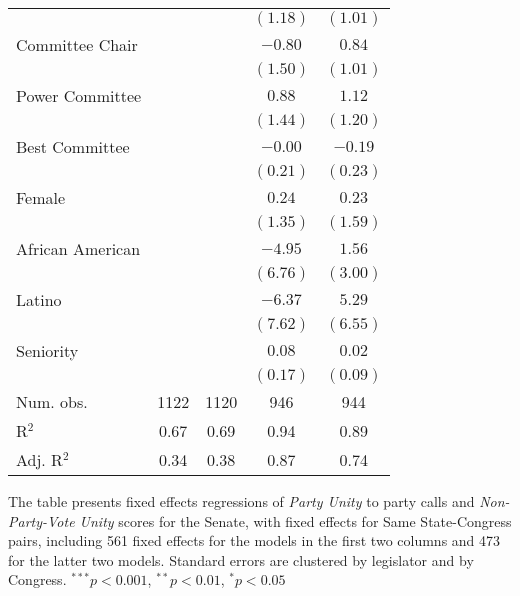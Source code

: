 \documentclass[12pt]{article}
\begin{document}
\begin{table}[!htbp]
{\begin{threeparttable}
\begin{tabular}{l c c c c }
                          &               &            & $(1.18)$     & $(1.01)$     \\
Committee Chair           &               &            & $-0.80$      & $0.84$       \\
                          &               &            & $(1.50)$     & $(1.01)$     \\
Power Committee           &               &            & $0.88$       & $1.12$       \\
                          &               &            & $(1.44)$     & $(1.20)$     \\
Best Committee            &               &            & $-0.00$      & $-0.19$      \\
                          &               &            & $(0.21)$     & $(0.23)$     \\
Female                    &               &            & $0.24$       & $0.23$       \\
                          &               &            & $(1.35)$     & $(1.59)$     \\
African American          &               &            & $-4.95$      & $1.56$       \\
                          &               &            & $(6.76)$     & $(3.00)$     \\
Latino                    &               &            & $-6.37$      & $5.29$       \\
                          &               &            & $(7.62)$     & $(6.55)$     \\
Seniority                 &               &            & $0.08$       & $0.02$       \\
                          &               &            & $(0.17)$     & $(0.09)$     \\
\hline
Num. obs.                 & 1122          & 1120       & 946          & 944          \\
R$^2$                     & 0.67          & 0.69       & 0.94         & 0.89         \\
Adj. R$^2$                & 0.34          & 0.38       & 0.87         & 0.74         \\

\hline
\end{tabular}

\begin{tablenotes}
   \item
   The table presents fixed effects regressions of \textit{Party Unity} to
   party calls and \textit {Non-Party-Vote Unity} scores for the Senate, with
   fixed effects for Same State-Congress pairs, including 561 fixed effects
   for the models in the first two columns and 473 for the latter two models.
   Standard errors are clustered by legislator and by Congress.
   $^{***}p<0.001$, $^{**}p<0.01$, $^*p<0.05$
 \end{tablenotes}
\end{threeparttable}
}
\end{table}
\end{document}
